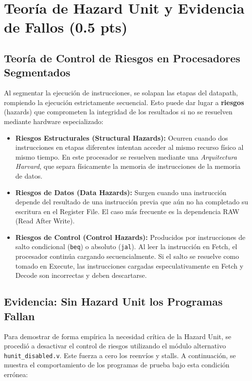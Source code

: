 \documentclass[12pt, a4paper]{article}
\begin{document}
\section{Teoría de Hazard Unit y Evidencia de Fallos (0.5 pts)}

\subsection{Teoría de Control de Riesgos en Procesadores Segmentados}

Al segmentar la ejecución de instrucciones, se solapan las etapas del datapath, rompiendo la ejecución estrictamente secuencial. Esto puede dar lugar a \textbf{riesgos} (hazards) que comprometen la integridad de los resultados si no se resuelven mediante hardware especializado:

\begin{itemize}
    \item \textbf{Riesgos Estructurales (Structural Hazards):} Ocurren cuando dos instrucciones en etapas diferentes intentan acceder al mismo recurso físico al mismo tiempo. En este procesador se resuelven mediante una \textit{Arquitectura Harvard}, que separa físicamente la memoria de instrucciones de la memoria de datos.
    \item \textbf{Riesgos de Datos (Data Hazards):} Surgen cuando una instrucción depende del resultado de una instrucción previa que aún no ha completado su escritura en el Register File. El caso más frecuente es la dependencia RAW (Read After Write).
    \item \textbf{Riesgos de Control (Control Hazards):} Producidos por instrucciones de salto condicional (\texttt{beq}) o absoluto (\texttt{jal}). Al leer la instrucción en Fetch, el procesador continúa cargando secuencialmente. Si el salto se resuelve como tomado en Execute, las instrucciones cargadas especulativamente en Fetch y Decode son incorrectas y deben descartarse.
\end{itemize}

\subsection{Evidencia: Sin Hazard Unit los Programas Fallan}

Para demostrar de forma empírica la necesidad crítica de la Hazard Unit, se procedió a desactivar el control de riesgos utilizando el módulo alternativo \texttt{hunit\_disabled.v}. Este fuerza a cero los reenvíos y stalls. A continuación, se muestra el comportamiento de los programas de prueba bajo esta condición errónea:
\end{document}

